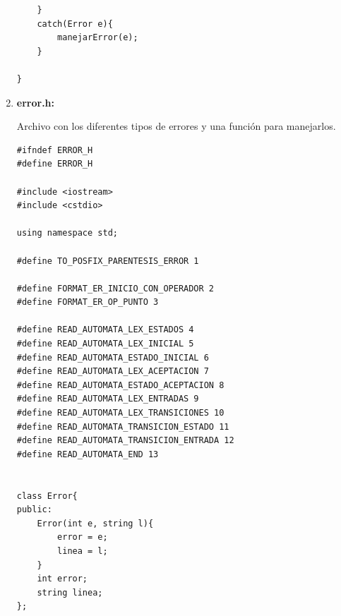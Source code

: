 \documentclass[a4paper,12pt]{article}
\begin{document}
\begin{enumerate}
\begin{lstlisting}
    }
    catch(Error e){
        manejarError(e);
    }
    
}

 \end{lstlisting}

 \item \textbf{error.h:} \par
 Archivo con los diferentes tipos de errores y una función para manejarlos.
 
 \begin{lstlisting}
#ifndef ERROR_H
#define ERROR_H

#include <iostream>
#include <cstdio>

using namespace std;

#define TO_POSFIX_PARENTESIS_ERROR 1

#define FORMAT_ER_INICIO_CON_OPERADOR 2
#define FORMAT_ER_OP_PUNTO 3

#define READ_AUTOMATA_LEX_ESTADOS 4
#define READ_AUTOMATA_LEX_INICIAL 5
#define READ_AUTOMATA_ESTADO_INICIAL 6
#define READ_AUTOMATA_LEX_ACEPTACION 7
#define READ_AUTOMATA_ESTADO_ACEPTACION 8
#define READ_AUTOMATA_LEX_ENTRADAS 9
#define READ_AUTOMATA_LEX_TRANSICIONES 10
#define READ_AUTOMATA_TRANSICION_ESTADO 11
#define READ_AUTOMATA_TRANSICION_ENTRADA 12
#define READ_AUTOMATA_END 13


class Error{
public:
    Error(int e, string l){
        error = e;
        linea = l;
    }
    int error;
    string linea;
};



\end{lstlisting}
\end{enumerate}
\end{document}
